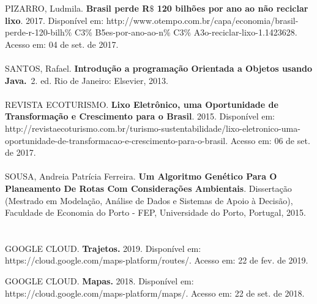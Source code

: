 PIZARRO, Ludmila. \textbf{Brasil perde R$\$$ 120 bilhões por ano ao não reciclar lixo}. 2017. Disponível em: http://www.otempo.com.br/capa/economia/brasil-perde-r-120-bilh$\%$ C3$\%$ B5es-por-ano-ao-n$\%$ C3$\%$ A3o-reciclar-lixo-1.1423628. Acesso em: 04 de set. de 2017.\\
 \\
SANTOS, Rafael. \textbf{Introdução a programação Orientada a Objetos usando Java.}\ 2. ed.  Rio de Janeiro: Elsevier, 2013.\\
 \\
REVISTA ECOTURISMO.\textbf{ Lixo Eletrônico, uma Oportunidade de Transformação e Crescimento para o Brasil}. 2015. Disponível em: http://revistaecoturismo.com.br/turismo-sustentabilidade/lixo-eletronico-uma-oportunidade-de-transformacao-e-crescimento-para-o-brasil. Acesso em: 06 de set. de 2017.\\
 \\
SOUSA, Andreia Patrícia Ferreira. \textbf{Um Algoritmo Genético Para O Planeamento De Rotas Com Considerações Ambientais}. Dissertação (Mestrado em Modelação, Análise de Dados e Sistemas de Apoio à Decisão), Faculdade de Economia do Porto - FEP, Universidade do Porto, Portugal, 2015.\\
 \\
 \\
GOOGLE CLOUD. \textbf{Trajetos. }2019. Disponível em: https://cloud.google.com/maps-platform/routes/. Acesso em: 22 de fev. de 2019.





GOOGLE CLOUD. \textbf{Mapas. }2018. Disponível em: https://cloud.google.com/maps-platform/maps/. Acesso em: 22 de set. de 2018.\\


